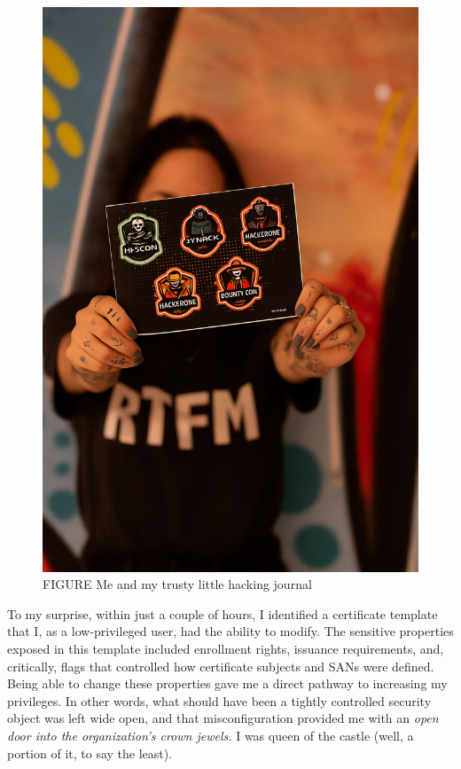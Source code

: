 {\begin{figure}
    \centering
    \includegraphics[width=1\linewidth,height=0.7\textheight,keepaspectratio]{me1.png}
    \caption{FIGURE Me and my trusty little hacking journal}
    \label{fig:placeholder}
\end{figure}

To my surprise, within just a couple of hours, I identified a certificate template that I, as a low-privileged user, had the ability to modify. The sensitive properties exposed in this template included enrollment rights, issuance requirements, and, critically, flags that controlled how certificate subjects and SANs were defined. Being able to change these properties gave me a direct pathway to increasing my privileges. In other words, what should have been a tightly controlled security object was left wide open, and that misconfiguration provided me with an \textit{open door into the organization's crown jewels.} I was queen of the castle (well, a portion of it, to say the least).

}
